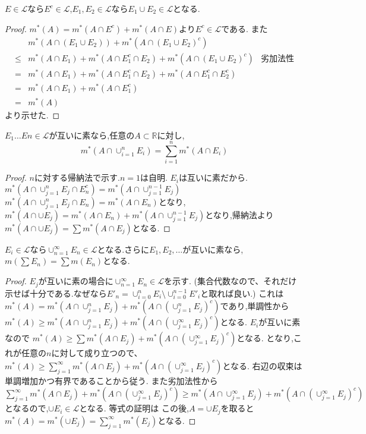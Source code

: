 \begin{lem}
 $E\in \mathcal{L}$なら$E^c \in \mathcal{L}$,$E_1, E_2 \in \mathcal{L}$なら$E_1 \cup E_2 \in \mathcal{L}$となる.
\end{lem}
\begin{proof}
$m^*(A) = m^*(A \cap E^c) + m^*(A \cap E)$より$E^c \in \mathcal{L}$である.
また
\begin{align*}
   & m^*(A \cap (E_1 \cup E_2)) + m^*(A \cap (E_1 \cup E_2)^c) \\
 \le & m^*(A \cap E_1 ) + m^*(A \cap E_1^c \cap E_2) + m^*(A \cap (E_1 \cup E_2)^c)  & \mbox{劣加法性}\\
 = & m^*(A \cap E_1 ) + m^*(A \cap E_1^c \cap E_2) + m^*(A \cap E_1^c \cap E_2^c) \\
 = & m^*(A \cap E_1 ) + m^*(A \cap E_1^c) \\
 = & m^*(A)
\end{align*}
より示せた.
\end{proof}

\begin{lem}
 $E_1 \ldots En \in \mathcal{L}$が互いに素なら,任意の$A \subset \mathbb{R}$に対し,
 \begin{equation*}
  m^*(A \cap \cup_{i=1}^n E_i)  = \sum_{i=1}^n m^*(A \cap E_i)
 \end{equation*}
\end{lem}
\begin{proof}
  $n$に対する帰納法で示す.$n=1$は自明.
  $E_i$は互いに素だから.$m^*(A \cap \cup_{j=1}^n E_j \cap E_n^c) = m^*(A \cap \cup_{j=1}^{n-1}E_j)$
  $m^*(A \cap \cup_{j=1}^n E_j \cap E_n) = m^*(A \cap E_n)$となり,
  $m^*(A \cap \cup E_j) = m^*(A \cap E_n) + m^*(A \cap \cup_{j=1}^{n-1}E_j)$となり,帰納法より
  $m^*(A \cap \cup E_j) = \sum m^*(A \cap E_j)$となる.
\end{proof}

\begin{lem}
  $E_i \in \mathcal{L}$なら$\cup_{n=1}^{\infty}E_n \in \mathcal{L}$となる.さらに$E_1, E_2, \ldots$が互いに素なら,$m(\sum E_n ) = \sum m(E_n)$となる.
\end{lem}
\begin{proof}
$E_j$が互いに素の場合に$ \cup_{n=1}^{\infty} E_n \in \mathcal{L}$を示す.
(集合代数なので、それだけ示せば十分である.なぜなら$E'_n = \cup_{i=0}^{n}E_i \setminus \cup_{i=0}^{n-1} E'_{i}$と取れば良い.)
これは$m^*(A)= m^*(A \cap \cup_{j=1}^n E_j) + m^*(A \cap  (\cup_{j=1}^n E_j)^c)$であり,単調性から
$m^*(A) \ge m^*(A \cap \cup_{j=1}^n E_j) + m^*(A \cap  (\cup_{j=1}^{\infty} E_j)^c)$となる.
$E_i$が互いに素なので $m^*(A) \ge \sum m^*(A \cap  E_j) + m^*(A \cap  (\cup_{j=1}^{\infty} E_j)^c)$となる.
となり,これが任意の$n$に対して成り立つので、
$m^*(A) \ge  \sum_{j=1}^{\infty} m^*(A \cap  E_j) + m^*(A \cap  (\cup_{j=1}^{\infty} E_j)^c)$となる.
右辺の収束は単調増加かつ有界であることから従う.
また劣加法性から
$\sum_{j=1}^{\infty} m^*(A \cap  E_j) + m^*(A \cap  (\cup_{j=1}^{\infty} E_j)^c) \ge  m^*(A \cap  \cup_{j=1}^{\infty} E_j) + m^*(A \cap  (\cup_{j=1}^{\infty} E_j)^c)$となるので,$\cup E_i \in \mathcal{L}$となる.
等式の証明は
この後,$A = \cup E_j$を取ると$m^*(A) = m^*(\cup E_j) = \sum_{j=1}^{\infty} m^*(E_j)$となる.
\end{proof}

